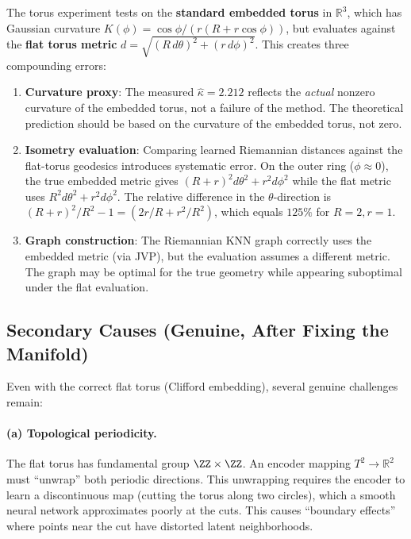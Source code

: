 \documentclass{article}
\newcommand{\RR}{\mathbb{R}}
\begin{document}
\begin{critical}
The torus experiment tests on the \textbf{standard embedded torus} in $\RR^3$,
which has Gaussian curvature $K(\phi) = \cos\phi/(r(R+r\cos\phi))$, but
evaluates against the \textbf{flat torus metric} $d = \sqrt{(R\,d\theta)^2 +
(r\,d\phi)^2}$. This creates three compounding errors:

\begin{enumerate}
    \item \textbf{Curvature proxy}: The measured $\hat{\kappa} = 2.212$
      reflects the \emph{actual} nonzero curvature of the embedded torus, not
      a failure of the method. The theoretical prediction should be based on
      the curvature of the embedded torus, not zero.

    \item \textbf{Isometry evaluation}: Comparing learned Riemannian distances
      against the flat-torus geodesics introduces systematic error. On the
      outer ring ($\phi \approx 0$), the true embedded metric gives
      $(R+r)^2 d\theta^2 + r^2 d\phi^2$ while the flat metric uses
      $R^2 d\theta^2 + r^2 d\phi^2$. The relative difference in the
      $\theta$-direction is $(R+r)^2/R^2 - 1 = (2r/R + r^2/R^2)$, which
      equals $125\%$ for $R=2, r=1$.

    \item \textbf{Graph construction}: The Riemannian KNN graph correctly
      uses the embedded metric (via JVP), but the evaluation assumes a
      different metric. The graph may be optimal for the true geometry while
      appearing suboptimal under the flat evaluation.
\end{enumerate}
\end{critical}

\subsection{Secondary Causes (Genuine, After Fixing the Manifold)}

Even with the correct flat torus (Clifford embedding), several genuine
challenges remain:

\paragraph{(a) Topological periodicity.}
The flat torus has fundamental group $\ZZ \times \ZZ$. An encoder mapping
$T^2 \to \RR^2$ must ``unwrap'' both periodic directions. This unwrapping
requires the encoder to learn a discontinuous map (cutting the torus along
two circles), which a smooth neural network approximates poorly at the
cuts. This causes ``boundary effects'' where points near the cut have
distorted latent neighborhoods.
\end{document}
